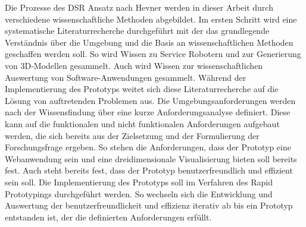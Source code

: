 Die Prozesse des \ac{DSR} Ansatz nach Hevner werden in dieser Arbeit durch verschiedene wissenschaftliche Methoden abgebildet. Im ersten Schritt wird eine systematische Literaturrecherche durchgeführt mit der das grundlegende Verständnis über die Umgebung und die Basis an wissenschaftlichen Methoden geschaffen werden soll. So wird Wissen zu Service Robotern und zur Generierung von 3D-Modellen gesammelt. Auch wird Wissen zur wissenschaftlichen Auswertung von Software-Anwendungen gesammelt. Während der Implementierung des Prototyps weitet sich diese Literaturrecherche auf die Lösung von auftretenden Problemen aus. Die Umgebungsanforderungen werden nach der Wissensfindung über eine kurze Anforderungsanalyse definiert. Diese kann auf die funktionalen und nicht funktionalen Anforderungen aufgebaut werden, die sich bereits aus der Zielsetzung und der Formulierung der Forschungsfrage ergeben. So stehen die Anforderungen, dass der Prototyp eine Webanwendung sein und eine dreidimensionale Visualisierung bieten soll bereits fest. Auch steht bereits fest, dass der Prototyp benutzerfreundlich und effizient sein soll. Die Implementierung des Prototyps soll im Verfahren des Rapid Prototypings durchgeführt werden. So wechseln sich die Entwicklung und Auswertung der benutzerfreundlickeit und effizienz iterativ ab bis ein Prototyp entstanden ist, der die definierten Anforderungen erfüllt.
